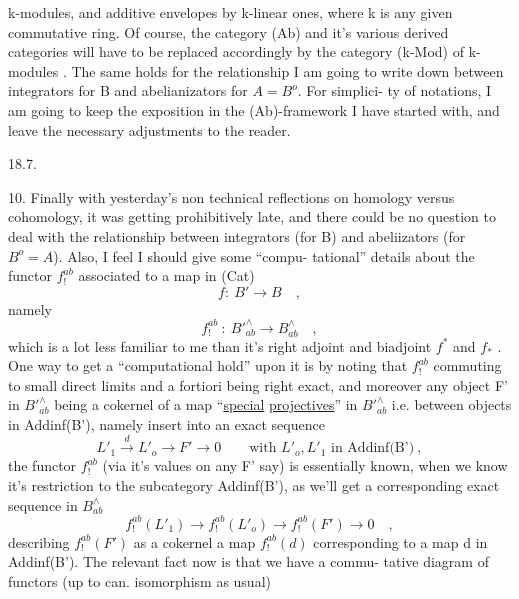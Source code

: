 
k-modules,  and additive envelopes by k-linear ones,  where k is any given
commutative ring.  Of course,  the category (Ab) and it's various derived
categories will have to be replaced accordingly by the category (k-Mod)
of k-modules . The same holds for the relationship I am going to write
down between integrators for B and abelianizators for $A=B^{o}$.  For simplici-%
ty of notations,  I am going to keep the exposition in the (Ab)-framework
 I have started with,  and leave the necessary adjustments to the
reader.

18.7.

10.  Finally with yesterday's non technical reflections on homology
versus cohomology,  it was getting prohibitively late,  and there could be
no question to deal with the relationship between integrators  (for B)
and abeliizators (for $B^{o}=A$).  Also,  I feel I should give some ``compu-%
tational'' details about the functor $f_{!}^{ab}$  associated to a map in (Cat)
\[ f:\ B' \longrightarrow B \quad , \]
namely
\[ f_{!}^{ab} \ :\ B'^{\wedge}_{ab} \longrightarrow B^{\wedge}_{ab} \quad , \]
which is a lot less familiar to me than it's right adjoint and biadjoint
$f^{*}$ and $f_{*}$ .  One way to get a ``computational hold'' upon it is by noting
that $f_{!}^{ab}$ commuting to small direct limits and a fortiori being right
exact,  and moreover any object F' in $B'^{\wedge}_{ab}$  being a cokernel of a map
  ``\uline{special} \uline{projectives}'' in $B'^{\wedge}_{ab}$  i.e.  between objects in
 Addinf(B'), namely insert into an exact sequence
\[ L'_{1} \xrightarrow{d} L'_{o} \to F' \to 0 \qquad \text{with } L'_{o},L'_{1} \text{ in Addinf(B')} \ , \]
the functor $f_{!}^{ab}$ (via it's values on any F' say)  is essentially known,
when we know it's restriction to the subcategory Addinf(B'),  as we'll
get a corresponding exact sequence in $B^{\wedge}_{ab}$
\[ f_{!}^{ab}(L'_{1}) \to f_{!}^{ab}(L'_{o}) \to f_{!}^{ab}(F') \to 0 \quad , \]
describing $f_{!}^{ab}(F')$ as a cokernel  a map   $f_{!}^{ab}(d)$  corresponding
to a map d in Addinf(B').  The relevant fact now is that we have a commu-%
tative diagram of functors (up to can. isomorphism as usual)

